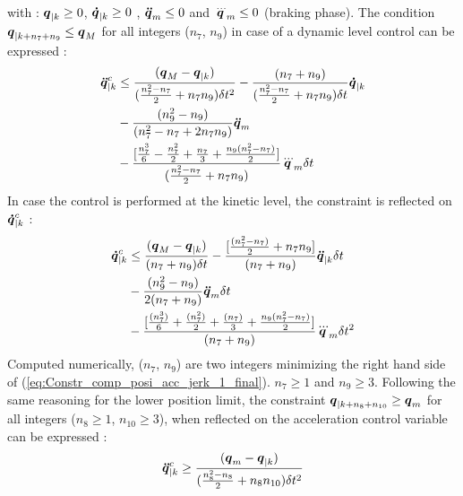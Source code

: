 \documentclass[a4paper, 10pt, conference]{ieeeconf}      %
\newcommand{\vect}[1]{\mbox{\boldmath${#1}$}}%
\begin{document}
{{\begin{equation}
\begin{split}
\label{eq:q_evolution_with_const_qddot_m_and_qdddot_m_2_final}
\end{split}
\end{equation} 
with : $\vect{q}_{|k} \geq 0$, $\vect{\dot{q}}_{|k} \geq 0$ , $\vect{\ddot{q}}_m \leq 0$ and $\vect{\dddot{q}}_m \leq 0$ (braking phase). The condition $\vect{q}_{|k+n_7+n_9} \leq \vect{q}_M$ for all integers ($n_7$, $n_9$) in case of a dynamic level control can be expressed :
\begin{equation}
\begin{split}
\vect{\ddot{q}}_{|k}^{c} & \leq \frac{(\vect{q}_M - \vect{q}_{|k})}{(\frac{n_7^2 - n_7}{2} + n_7 n_9)\delta t^2} - \frac{(n_7+n_9)}{(\frac{n_7^2 - n_7}{2} + n_7 n_9) \delta t} \vect{\dot{q}}_{|k}\\
& - \frac{(n_9^2-n_9)}{(n_7^2 - n_7 + 2 n_7 n_9)}  \vect{\ddot{q}}_m \\
& -\frac{[\frac{n_7^3}{6} - \frac{n_7^2}{2} + \frac{n_7}{3} + \frac{n_9(n_7^2-n_7)}{2}]}{(\frac{n_7^2 - n_7}{2} + n_7 n_9)} \vect{\dddot{q}}_m \delta t 
\label{eq:Constr_comp_posi_acc_jerk_1_final}
\end{split}
\end{equation}
In case the control is performed at the kinetic level, the constraint is reflected on $\vect{\dot{q}}_{|k}^{c}$ : 
\begin{equation}
\begin{split}
\vect{\dot{q}}_{|k}^{c} & \leq \frac{(\vect{q}_M - \vect{q}_{|k})}{(n_7 + n_9) \delta t}  -\frac{[\frac{(n_7^2-n_7)}{2} + n_7 n_9]}{(n_7 + n_9)}  \vect{\ddot{q}}_{|k} \delta t\\ 
 & - \frac{(n_9^2-n_9)}{2(n_7 + n_9)} \vect{\ddot{q}}_m \delta t \\
           & - \frac{[\frac{(n_7^3)}{6} + \frac{(n_7^2)}{2} + \frac{(n_7)}{3} + \frac{n_9 (n_7^2 - n_7)}{2}]}{(n_7 + n_9)} \vect{\dddot{q}}_m \delta t^2 
\label{eq:Constr_comp_posi_acc_jerk_1_kinema_final}
\end{split}
\end{equation}
Computed numerically, ($n_7$, $n_9$) are two integers minimizing the right hand side of (\ref{eq:Constr_comp_posi_acc_jerk_1_final}). $n_7 \geq 1$ and $n_9 \geq 3$.
Following the same reasoning for the lower position limit, the constraint $\vect{q}_{|k+n_8+n_{10}} \geq \vect{q}_m$ for all integers ($n_8 \geq 1$, $n_{10} \geq 3$), when reflected on the acceleration control variable can be expressed : 
\begin{equation}
\begin{split}
\vect{\ddot{q}}_{|k}^{c} & \geq \frac{(\vect{q}_m - \vect{q}_{|k})}{(\frac{n_8^2 - n_8}{2} + n_8 n_{10})\delta t^2} \\ 

\end{split}
\end{equation}}}
\end{document}
